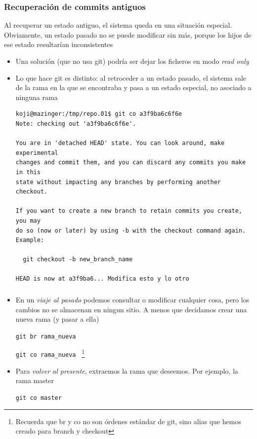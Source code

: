 \documentclass[ucs]{beamer}
\begin{document}

\begin{frame}[fragile]
\frametitle{Recuperación de commits antiguos}

Al recuperar un estado antiguo, 
el sistema queda en una situación especial.
Obviamente, un estado pasado no se puede modificar sin más, porque los
hijos de ese estado resultarían inconsistentes

\begin{itemize}
\item
Una solución (que no usa git) podría ser dejar
los ficheros en modo \emph{read only}
\item
Lo que hace git es distinto: al retroceder a un estado pasado,
el sistema sale de la rama en la que se encontraba y pasa a un
estado especial, no asociado a ninguna rama


  \begin{tiny}
  \begin{verbatim}
koji@mazinger:/tmp/repo.01$ git co a3f9ba6c6f6e
Note: checking out 'a3f9ba6c6f6e'.

You are in 'detached HEAD' state. You can look around, make experimental
changes and commit them, and you can discard any commits you make in this
state without impacting any branches by performing another checkout.

If you want to create a new branch to retain commits you create, you may
do so (now or later) by using -b with the checkout command again. Example:

  git checkout -b new_branch_name

HEAD is now at a3f9ba6... Modifica esto y lo otro
  \end{verbatim}
  \end{tiny}

\end{itemize}
\end{frame}


\begin{frame}[fragile]
\frametitle{}
\begin{itemize}

\item
En un \emph{viaje al pasado} podemos consultar o modificar cualquier
cosa, pero los cambios no se almacenan en ningun sitio. A menos que
decidamos crear una nueva rama (y pasar a ella)

\verb|git br rama_nueva |

\verb|git co rama_nueva |
\footnote{Recuerda que br y co no son órdenes estándar de git,
sino alias que hemos creado para branch y checkout}
\item
Para \emph{volver al presente}, extraemos la rama que deseemos. Por ejemplo,
la rama master

\verb|git co master|


\end{itemize}
\end{frame}
\end{document}
